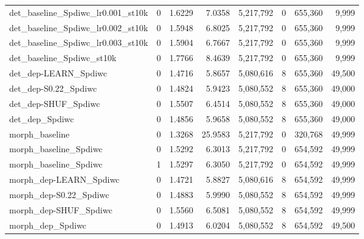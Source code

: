 \begin{tabular}{lrrrrrrr}
det\_baseline\_Spdiwc\_lr0.001\_st10k & 0 & 1.6229 & 7.0358 & 5,217,792 & 0 & 655,360 & 9,999 \\
det\_baseline\_Spdiwc\_lr0.002\_st10k & 0 & 1.5948 & 6.8025 & 5,217,792 & 0 & 655,360 & 9,999 \\
det\_baseline\_Spdiwc\_lr0.003\_st10k & 0 & 1.5904 & 6.7667 & 5,217,792 & 0 & 655,360 & 9,999 \\
det\_baseline\_Spdiwc\_st10k & 0 & 1.7766 & 8.4639 & 5,217,792 & 0 & 655,360 & 9,999 \\
det\_dep-LEARN\_Spdiwc & 0 & 1.4716 & 5.8657 & 5,080,616 & 8 & 655,360 & 49,500 \\
det\_dep-S0.22\_Spdiwc & 0 & 1.4824 & 5.9423 & 5,080,552 & 8 & 655,360 & 49,000 \\
det\_dep-SHUF\_Spdiwc & 0 & 1.5507 & 6.4514 & 5,080,552 & 8 & 655,360 & 49,000 \\
det\_dep\_Spdiwc & 0 & 1.4856 & 5.9658 & 5,080,552 & 8 & 655,360 & 49,000 \\
morph\_baseline & 0 & 1.3268 & 25.9583 & 5,217,792 & 0 & 320,768 & 49,999 \\
morph\_baseline\_Spdiwc & 0 & 1.5292 & 6.3013 & 5,217,792 & 0 & 654,592 & 49,999 \\
morph\_baseline\_Spdiwc & 1 & 1.5297 & 6.3050 & 5,217,792 & 0 & 654,592 & 49,999 \\
morph\_dep-LEARN\_Spdiwc & 0 & 1.4721 & 5.8827 & 5,080,616 & 8 & 654,592 & 49,999 \\
morph\_dep-S0.22\_Spdiwc & 0 & 1.4883 & 5.9990 & 5,080,552 & 8 & 654,592 & 49,999 \\
morph\_dep-SHUF\_Spdiwc & 0 & 1.5560 & 6.5081 & 5,080,552 & 8 & 654,592 & 49,999 \\
morph\_dep\_Spdiwc & 0 & 1.4913 & 6.0204 & 5,080,552 & 8 & 654,592 & 49,500 \\
\bottomrule
\end{tabular}
